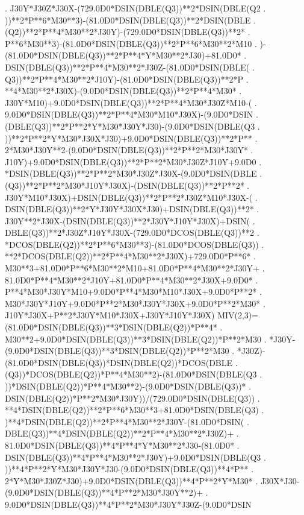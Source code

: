 \begin{framedverbatim}
     . J30Y*J30Z*J30X-(729.0D0*DSIN(DBLE(Q3))**2*DSIN(DBLE(Q2
     . ))**2*P**6*M30**3)-(81.0D0*DSIN(DBLE(Q3))**2*DSIN(DBLE
     . (Q2))**2*P**4*M30**2*J30Y)-(729.0D0*DSIN(DBLE(Q3))**2*
     . P**6*M30**3)-(81.0D0*DSIN(DBLE(Q3))**2*P**6*M30**2*M10
     . )-(81.0D0*DSIN(DBLE(Q3))**2*P**4*Y*M30**2*J30)+81.0D0*
     . DSIN(DBLE(Q3))**2*P**4*M30**2*J30Z-(81.0D0*DSIN(DBLE(
     . Q3))**2*P**4*M30**2*J10Y)-(81.0D0*DSIN(DBLE(Q3))**2*P
     . **4*M30**2*J30X)-(9.0D0*DSIN(DBLE(Q3))**2*P**4*M30*
     . J30Y*M10)+9.0D0*DSIN(DBLE(Q3))**2*P**4*M30*J30Z*M10-(
     . 9.0D0*DSIN(DBLE(Q3))**2*P**4*M30*M10*J30X)-(9.0D0*DSIN
     . (DBLE(Q3))**2*P**2*Y*M30*J30Y*J30)-(9.0D0*DSIN(DBLE(Q3
     . ))**2*P**2*Y*M30*J30X*J30)+9.0D0*DSIN(DBLE(Q3))**2*P**
     . 2*M30*J30Y**2-(9.0D0*DSIN(DBLE(Q3))**2*P**2*M30*J30Y*
     . J10Y)+9.0D0*DSIN(DBLE(Q3))**2*P**2*M30*J30Z*J10Y+9.0D0
     . *DSIN(DBLE(Q3))**2*P**2*M30*J30Z*J30X-(9.0D0*DSIN(DBLE
     . (Q3))**2*P**2*M30*J10Y*J30X)-(DSIN(DBLE(Q3))**2*P**2*
     . J30Y*M10*J30X)+DSIN(DBLE(Q3))**2*P**2*J30Z*M10*J30X-(
     . DSIN(DBLE(Q3))**2*Y*J30Y*J30X*J30)+DSIN(DBLE(Q3))**2*
     . J30Y**2*J30X-(DSIN(DBLE(Q3))**2*J30Y*J10Y*J30X)+DSIN(
     . DBLE(Q3))**2*J30Z*J10Y*J30X-(729.0D0*DCOS(DBLE(Q3))**2
     . *DCOS(DBLE(Q2))**2*P**6*M30**3)-(81.0D0*DCOS(DBLE(Q3))
     . **2*DCOS(DBLE(Q2))**2*P**4*M30**2*J30X)+729.0D0*P**6*
     . M30**3+81.0D0*P**6*M30**2*M10+81.0D0*P**4*M30**2*J30Y+
     . 81.0D0*P**4*M30**2*J10Y+81.0D0*P**4*M30**2*J30X+9.0D0*
     . P**4*M30*J30Y*M10+9.0D0*P**4*M30*M10*J30X+9.0D0*P**2*
     . M30*J30Y*J10Y+9.0D0*P**2*M30*J30Y*J30X+9.0D0*P**2*M30*
     . J10Y*J30X+P**2*J30Y*M10*J30X+J30Y*J10Y*J30X)
      MIV(2,3)=(81.0D0*DSIN(DBLE(Q3))**3*DSIN(DBLE(Q2))*P**4*
     . M30**2+9.0D0*DSIN(DBLE(Q3))**3*DSIN(DBLE(Q2))*P**2*M30
     . *J30Y-(9.0D0*DSIN(DBLE(Q3))**3*DSIN(DBLE(Q2))*P**2*M30
     . *J30Z)-(81.0D0*DSIN(DBLE(Q3))*DSIN(DBLE(Q2))*DCOS(DBLE
     . (Q3))*DCOS(DBLE(Q2))*P**4*M30**2)-(81.0D0*DSIN(DBLE(Q3
     . ))*DSIN(DBLE(Q2))*P**4*M30**2)-(9.0D0*DSIN(DBLE(Q3))*
     . DSIN(DBLE(Q2))*P**2*M30*J30Y))/(729.0D0*DSIN(DBLE(Q3))
     . **4*DSIN(DBLE(Q2))**2*P**6*M30**3+81.0D0*DSIN(DBLE(Q3)
     . )**4*DSIN(DBLE(Q2))**2*P**4*M30**2*J30Y-(81.0D0*DSIN(
     . DBLE(Q3))**4*DSIN(DBLE(Q2))**2*P**4*M30**2*J30Z)+
     . 81.0D0*DSIN(DBLE(Q3))**4*P**4*Y*M30**2*J30-(81.0D0*
     . DSIN(DBLE(Q3))**4*P**4*M30**2*J30Y)+9.0D0*DSIN(DBLE(Q3
     . ))**4*P**2*Y*M30*J30Y*J30-(9.0D0*DSIN(DBLE(Q3))**4*P**
     . 2*Y*M30*J30Z*J30)+9.0D0*DSIN(DBLE(Q3))**4*P**2*Y*M30*
     . J30X*J30-(9.0D0*DSIN(DBLE(Q3))**4*P**2*M30*J30Y**2)+
     . 9.0D0*DSIN(DBLE(Q3))**4*P**2*M30*J30Y*J30Z-(9.0D0*DSIN

\end{framedverbatim}
